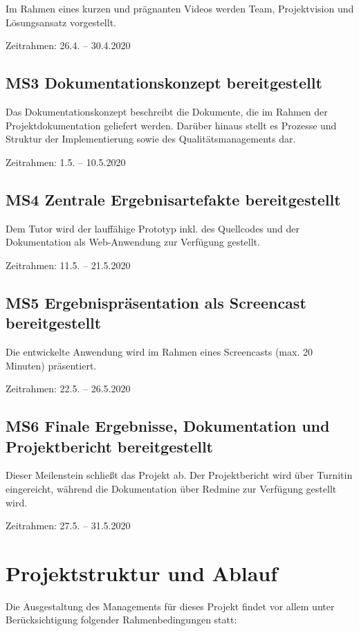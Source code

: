 \documentclass[a4paper,11pt,listof=numbered,glossary=totoc,parskip=half,toc=bib]{scrreprt}
\begin{document}
{Im Rahmen eines kurzen und prägnanten Videos werden Team, Projektvision und Lösungsansatz vorgestellt.

Zeitrahmen: 26.4. -- 30.4.2020

\subsection{MS3 Dokumentationskonzept bereitgestellt}

Das Dokumentationskonzept beschreibt die Dokumente, die im Rahmen der Projektdokumentation geliefert werden. Darüber hinaus stellt es Prozesse und Struktur der Implementierung sowie des Qualitätsmanagements dar.

Zeitrahmen: 1.5. -- 10.5.2020

\subsection{MS4 Zentrale Ergebnisartefakte bereitgestellt}

Dem Tutor wird der lauffähige Prototyp inkl. des Quellcodes und der Dokumentation als Web-Anwendung zur Verfügung gestellt.

Zeitrahmen: 11.5. -- 21.5.2020

\subsection{MS5 Ergebnispräsentation als Screencast bereitgestellt}

Die entwickelte Anwendung wird im Rahmen eines Screencasts (max. 20 Minuten) präsentiert.

Zeitrahmen: 22.5. -- 26.5.2020

\subsection{MS6 Finale Ergebnisse, Dokumentation und Projektbericht bereitgestellt}

Dieser Meilenstein schließt das Projekt ab. Der Projektbericht wird über Turnitin eingereicht, während die Dokumentation über Redmine zur Verfügung gestellt wird.

Zeitrahmen: 27.5. -- 31.5.2020

	\newpage
	\section{Projektstruktur und Ablauf}

Die Ausgestaltung des Managements für dieses Projekt findet vor allem unter Berücksichtigung folgender Rahmenbedingungen statt:

}
\end{document}
